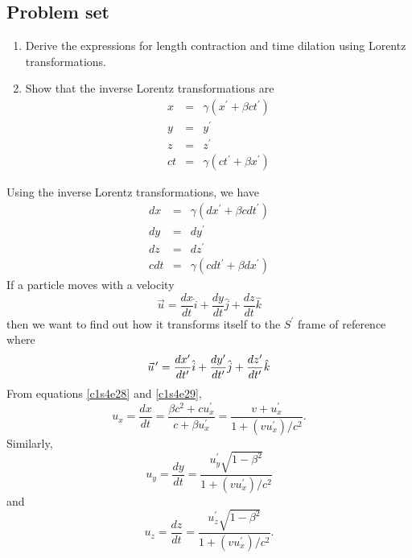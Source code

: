 \subsection{Problem set}
\begin{enumerate}
\item Derive the expressions for length contraction and time dilation using
Lorentz transformations.
\item Show that the inverse Lorentz transformations are
\begin{eqnarray}
x &=& \gamma(x^\prime + \beta ct^\prime) \label{c1s4e24} \\
y &=& y^\prime \label{c1s4e25} \\
z &=& z^\prime \label{c1s4e26} \\
ct &=& \gamma(ct^\prime + \beta x^\prime) \label{c1s4e27}
\end{eqnarray}
\end{enumerate}

Using the inverse Lorentz transformations, we have
\begin{eqnarray}
dx &=& \gamma(dx^\prime + \beta cdt^\prime) \label{c1s4e28} \\
dy &=& dy^\prime \\
dz &=& dz^\prime \\
cdt &=& \gamma(cdt^\prime + \beta dx^\prime) \label{c1s4e29}
\end{eqnarray}
If a particle moves with a velocity
\[
\vec{u} = \frac{dx}{dt}\hat{i} + \frac{dy}{dt}\hat{j} + \frac{dz}{dt}\hat{k}
\]
then we want to find out how it transforms itself to the $S^\prime$ frame of 
reference where
\[
\pvec{u}^\prime = \frac{dx^\prime}{dt^\prime}\hat{i} + 
\frac{dy^\prime}{dt^\prime}\hat{j} + \frac{dz^\prime}{dt^\prime}\hat{k}
\]
From equations \eqref{c1s4e28} and \eqref{c1s4e29},
\begin{equation}\label{c1s4e30}
u_x = \frac{dx}{dt} = \frac{\beta c^2 + cu_x^\prime}{c + \beta u_x^\prime}
= \frac{v + u_x^\prime}{1 + (vu_x^\prime)/c^2}.
\end{equation} 
Similarly,
\begin{equation}\label{c1s4e31}
u_y=\frac{dy}{dt} = \frac{u_y^\prime \sqrt{1 - \beta^2}}{1 + (vu_x^\prime)/c^2}
\end{equation}
and
\begin{equation}\label{c1s4e32}
u_z=\frac{dz}{dt} = \frac{u_z^\prime \sqrt{1 - \beta^2}}{1 + (vu_x^\prime)/c^2}.
\end{equation}

